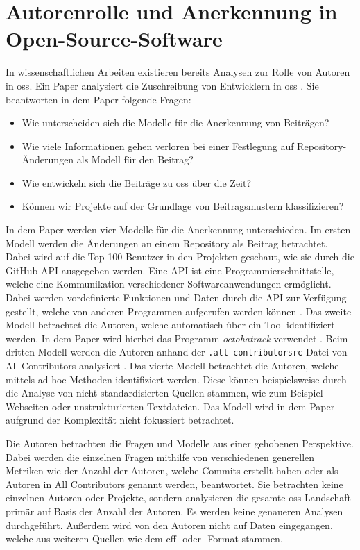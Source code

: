 \section{Autorenrolle und Anerkennung in Open-Source-Software}
\label{sec:autorenrolle-oss}
In wissenschaftlichen Arbeiten existieren bereits Analysen zur Rolle von Autoren in \gls{oss}.
Ein Paper analysiert die Zuschreibung von Entwicklern in \gls{oss} \autocite{young_which_2021}.
Sie beantworten in dem Paper folgende Fragen:

\begin{itemize}
  \item Wie unterscheiden sich die Modelle für die Anerkennung von Beiträgen?
  \item Wie viele Informationen gehen verloren bei einer Festlegung auf Repository-Änderungen als Modell für den Beitrag?
  \item Wie entwickeln sich die Beiträge zu \gls{oss} über die Zeit?
  \item Können wir Projekte auf der Grundlage von Beitragsmustern klassifizieren?
\end{itemize}

In dem Paper werden vier Modelle für die Anerkennung unterschieden.
Im ersten Modell werden die Änderungen an einem Repository als Beitrag betrachtet.
Dabei wird auf die Top-100-Benutzer in den Projekten geschaut, wie sie durch die GitHub-API ausgegeben werden.
Eine API ist eine Programmierschnittstelle, welche eine Kommunikation verschiedener Softwareanwendungen ermöglicht.
Dabei werden vordefinierte Funktionen und Daten durch die API zur Verfügung gestellt, welche von anderen Programmen aufgerufen werden können \autocite{github_about_2022}.
Das zweite Modell betrachtet die Autoren, welche automatisch über ein Tool identifiziert werden.
In dem Paper wird hierbei das Programm \emph{octohatrack} verwendet \autocites{young_which_2021}{mclaughlin_octohatrack_2020}.
Beim dritten Modell werden die Autoren anhand der \texttt{.all-contributorsrc}-Datei von \glqq All Contributors\grqq{} analysiert \autocites{young_which_2021}{bolam_recognize_2024}.
Das vierte Modell betrachtet die Autoren, welche mittels ad-hoc-Methoden identifiziert werden.
Diese können beispielsweise durch die Analyse von nicht standardisierten Quellen stammen, wie zum Beispiel Webseiten oder unstrukturierten Textdateien.
Das Modell wird in dem Paper aufgrund der Komplexität nicht fokussiert betrachtet.

Die Autoren betrachten die Fragen und Modelle aus einer gehobenen Perspektive.
Dabei werden die einzelnen Fragen mithilfe von verschiedenen generellen Metriken wie der Anzahl der Autoren, welche Commits erstellt haben oder als Autoren in \glqq All Contributors\grqq{} genannt werden, beantwortet.
Sie betrachten keine einzelnen Autoren oder Projekte, sondern analysieren die gesamte \gls{oss}-Landschaft primär auf Basis der Anzahl der Autoren.
Es werden keine genaueren Analysen durchgeführt.
Außerdem wird von den Autoren nicht auf Daten eingegangen, welche aus weiteren Quellen wie dem \gls{cff}- oder -Format stammen.
